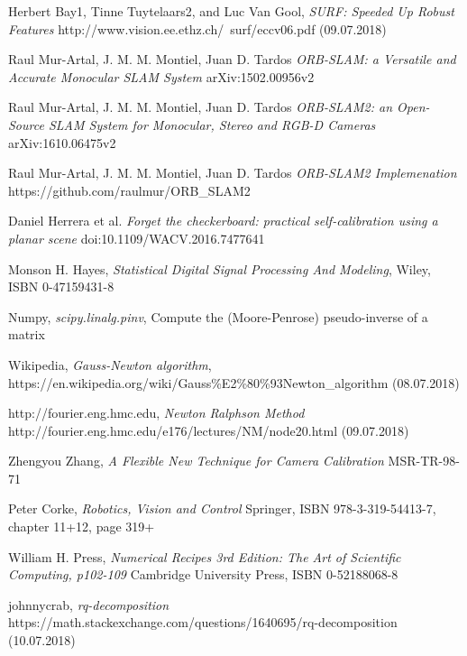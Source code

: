 \documentclass[11pt,a4paper,titlepage,oneside]{report}
\begin{document}
\listoffigures
 
\begin{thebibliography}{1}

  Herbert Bay1, Tinne Tuytelaars2, and Luc Van Gool,
  \textit{SURF: Speeded Up Robust Features}
  http://www.vision.ee.ethz.ch/~surf/eccv06.pdf (09.07.2018)

  Raul Mur-Artal, J. M. M. Montiel, Juan D. Tardos
  \textit{ORB-SLAM: a Versatile and Accurate Monocular SLAM System}
  arXiv:1502.00956v2

  Raul Mur-Artal, J. M. M. Montiel, Juan D. Tardos
  \textit{ORB-SLAM2: an Open-Source SLAM System for Monocular, Stereo and RGB-D Cameras}
	arXiv:1610.06475v2 

  Raul Mur-Artal, J. M. M. Montiel, Juan D. Tardos
  \textit{ORB-SLAM2 Implemenation}
	https://github.com/raulmur/ORB\_SLAM2


  Daniel Herrera et al.
  \textit{Forget the checkerboard: practical self-calibration using a planar scene}
  doi:10.1109/WACV.2016.7477641

  Monson H. Hayes,
  \textit{Statistical Digital Signal Processing And Modeling},
  Wiley, ISBN 0-47159431-8

  Numpy,
  \textit{scipy.linalg.pinv},
  Compute the (Moore-Penrose) pseudo-inverse of a matrix

  Wikipedia,
  \textit{Gauss-Newton algorithm},
  https://en.wikipedia.org/wiki/Gauss\%E2\%80\%93Newton\_algorithm (08.07.2018)

  http://fourier.eng.hmc.edu,
  \textit{Newton Ralphson Method}
  http://fourier.eng.hmc.edu/e176/lectures/NM/node20.html (09.07.2018)

  Zhengyou Zhang,
  \textit{A Flexible New Technique for Camera Calibration}
  MSR-TR-98-71

	Peter Corke,
	\textit{Robotics, Vision and Control}
	Springer, ISBN 978-3-319-54413-7, chapter 11+12, page 319+

	William H. Press,
	\textit{Numerical Recipes 3rd Edition: The Art of Scientific Computing, p102-109} 
	Cambridge University Press, ISBN 0-52188068-8

	johnnycrab,
	\textit{rq-decomposition} 
	https://math.stackexchange.com/questions/1640695/rq-decomposition (10.07.2018)


\end{thebibliography}
\end{document}
